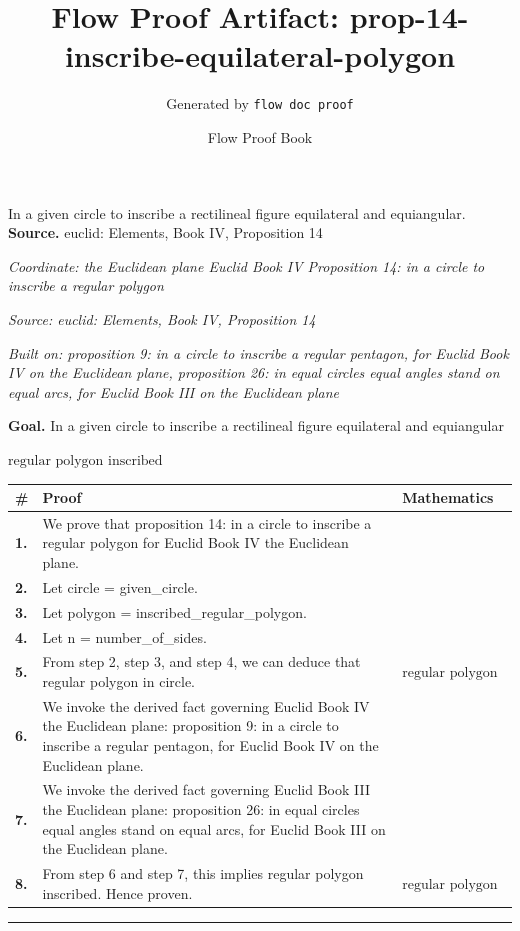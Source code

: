 \documentclass[11pt]{article}
\title{Flow Proof Artifact: prop-14-inscribe-equilateral-polygon}
\author{Generated by \texttt{flow doc proof}}
\date{Flow Proof Book}
\theoremstyle{definition}
\begin{document}
\maketitle
In a given circle to inscribe a rectilineal figure equilateral and equiangular.\\[0.5em]
\textbf{Source.} euclid: Elements, Book IV, Proposition 14\\[0.5em]
\bigskip
{}\par
\smallskip\noindent\textit{Coordinate: the Euclidean plane \cdot Euclid Book IV \cdot Proposition 14: in a circle to inscribe a regular polygon}\par
\smallskip\noindent\textit{Source: euclid: Elements, Book IV, Proposition 14}\par
\smallskip\noindent\textit{Built on: proposition 9: in a circle to inscribe a regular pentagon, for Euclid Book IV on the Euclidean plane, proposition 26: in equal circles equal angles stand on equal arcs, for Euclid Book III on the Euclidean plane}\par
\medskip
\noindent\textbf{Goal.} In a given circle to inscribe a rectilineal figure equilateral and equiangular\par
\noindent$\displaystyle \text{regular polygon inscribed}$\par
\medskip
\noindent
\begin{tabular}{@{} >{\raggedright\arraybackslash}p{} >{\raggedright\arraybackslash}p{} >{\raggedleft\arraybackslash}p{} @{}}
\textbf{\#} & \textbf{Proof} & \textbf{Mathematics} \\
\midrule
\textbf{1.} & We prove that proposition 14: in a circle to inscribe a regular polygon for Euclid Book IV the Euclidean plane. & \\[0.45em]
\textbf{2.} & Let circle = given\_circle. & \\[0.45em]
\textbf{3.} & Let polygon = inscribed\_regular\_polygon. & \\[0.45em]
\textbf{4.} & Let n = number\_of\_sides. & \\[0.45em]
\textbf{5.} & From step 2, step 3, and step 4, we can deduce that regular polygon in circle. & $\displaystyle \text{regular polygon in circle}$ \\[0.45em]
\textbf{6.} & We invoke the derived fact governing Euclid Book IV the Euclidean plane: proposition 9: in a circle to inscribe a regular pentagon, for Euclid Book IV on the Euclidean plane. & \\[0.45em]
\textbf{7.} & We invoke the derived fact governing Euclid Book III the Euclidean plane: proposition 26: in equal circles equal angles stand on equal arcs, for Euclid Book III on the Euclidean plane. & \\[0.45em]
\textbf{8.} & From step 6 and step 7, this implies regular polygon inscribed. Hence proven. & $\displaystyle \text{regular polygon inscribed}$ \\[0.45em]
\bottomrule
\end{tabular}
\label{thm:Geometry-Euclid Book IV-proposition_14_in_a_circle_to_inscribe_a_regular_polygon}
\par\medskip\hrule
\end{document}
